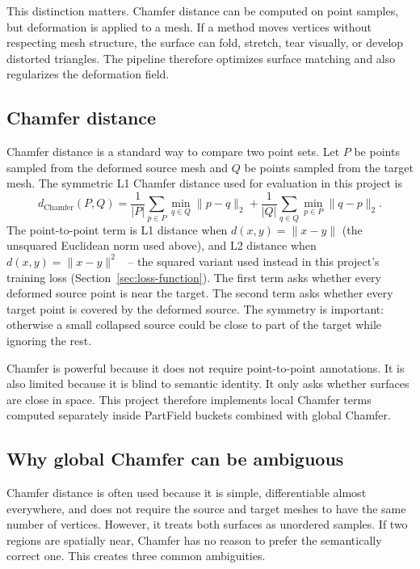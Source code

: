 \documentclass{article}
\begin{document}
This distinction matters. Chamfer distance can be computed on point samples, but deformation is
applied to a mesh. If a method moves vertices without respecting mesh structure, the surface can
fold, stretch, tear visually, or develop distorted triangles. The pipeline therefore optimizes
surface matching and also regularizes the deformation field.

\subsection{Chamfer distance}
\label{sec:chamfer}

Chamfer distance is a standard way to compare two point sets. Let $P$ be points sampled from the
deformed source mesh and $Q$ be points sampled from the target mesh. The symmetric L1 Chamfer
distance used for evaluation in this project is
\[
d_{\mathrm{Chamfer}}(P,Q) =
\frac{1}{|P|}\sum_{p \in P}\min_{q \in Q}\|p-q\|_2
+
\frac{1}{|Q|}\sum_{q \in Q}\min_{p \in P}\|q-p\|_2 .
\]
The point-to-point term is L1 distance when $d(x,y) = \|x-y\|$ (the unsquared Euclidean norm used
above), and L2 distance when $d(x,y) = \|x-y\|^2$~\cite{chamferl1} -- the squared variant used
instead in this project's training loss (Section~\ref{sec:loss-function}). The first term asks whether every deformed source point is near the target. The second term asks
whether every target point is covered by the deformed source. The symmetry is important: otherwise
a small collapsed source could be close to part of the target while ignoring the rest.

Chamfer is powerful because it does not require point-to-point annotations. It is also limited
because it is blind to semantic identity. It only asks whether surfaces are close in space. This
project therefore implements local Chamfer terms computed separately inside PartField buckets
combined with global Chamfer.

\subsection{Why global Chamfer can be ambiguous}

Chamfer distance is often used because it is simple, differentiable almost everywhere, and does not
require the source and target meshes to have the same number of vertices. However, it treats both
surfaces as unordered samples. If two regions are spatially near, Chamfer has no reason to prefer
the semantically correct one. This creates three common ambiguities.
\end{document}
